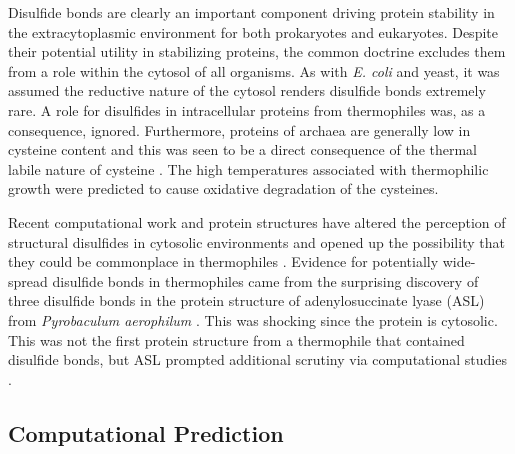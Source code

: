 Disulfide bonds are clearly an important component driving protein stability in
the extracytoplasmic environment for both prokaryotes and eukaryotes.  Despite
their potential utility in stabilizing proteins, the common doctrine excludes
them from a role within the cytosol of all organisms.  As with \emph{E. coli}
and yeast, it was assumed the reductive nature of the cytosol renders disulfide
bonds extremely rare.  A role for disulfides in intracellular proteins
from thermophiles was, as a consequence, ignored.  Furthermore, proteins of
archaea are generally low in cysteine content and this was seen to be a direct
consequence of the thermal labile nature of cysteine \cite{PMID_10097079}. The
high temperatures associated with thermophilic growth were predicted to cause
oxidative degradation of the cysteines.

Recent computational work and protein structures have altered the
perception of structural disulfides in cytosolic environments and opened up
the possibility that they could be commonplace in thermophiles
\cite{beeby2005gdb,mallick2002gei}.  Evidence for potentially wide-spread
disulfide bonds in thermophiles came from the surprising discovery of three
disulfide bonds in the protein structure of adenylosuccinate lyase (ASL) from
\emph{Pyrobaculum aerophilum} \cite{toth2000sal}. This was shocking since the
protein is cytosolic. This was not the first protein structure from a thermophile that
contained disulfide bonds, but ASL prompted additional scrutiny via
computational studies
\cite{jiang1996sai,maes1999cst,dedecker1996csh,chiu2001csn,meyer2002hpt}.  

\subsection{Computational Prediction}

